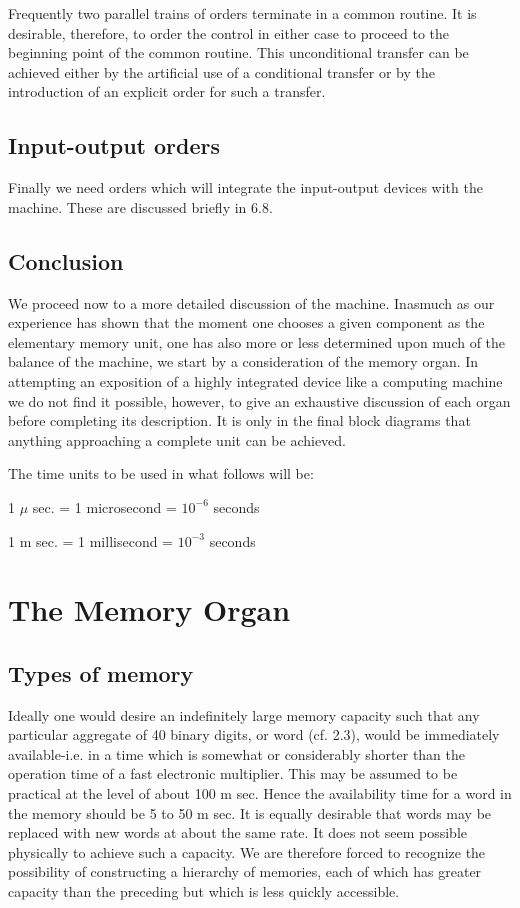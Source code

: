 \documentclass[12pt]{amsart}
\begin{document}
Frequently two parallel trains of orders terminate in a common routine. It is desirable, therefore, to order the control in either case to proceed to the beginning point of the common routine. This unconditional transfer can be achieved either by the artificial use of a conditional transfer or by the introduction of an explicit order for such a transfer.

\subsection{Input-output orders}
Finally we need orders which will integrate the input-output devices with the machine. These are discussed briefly in 6.8.

\subsection{Conclusion}
We proceed now to a more detailed discussion of the machine. Inasmuch as our experience has shown that the moment one chooses a given component as the elementary memory unit, one has also more or less determined upon much of the balance of the machine, we start by a consideration of the memory organ. In attempting an exposition of a highly integrated device like a computing machine we do not find it possible, however, to give an exhaustive discussion of each organ before completing its description. It is only in the final block diagrams that anything approaching a complete unit can be achieved.

The time units to be used in what follows will be:
\begin{center}
1 $\mu$ sec. = 1 microsecond = $10^{-6}$ seconds

1 m sec. = 1 millisecond = $10^{-3}$ seconds
\end{center}

\section{The Memory Organ}

\subsection{Types of memory}
Ideally one would desire an indefinitely large memory capacity such that any particular aggregate of 40 binary digits, or word (cf. 2.3), would be immediately available-i.e. in a time which is somewhat or considerably shorter than the operation time of a fast electronic multiplier. This may be assumed to be practical at the level of about 100 m sec. Hence the availability time for a word in the memory should be 5 to 50 m sec. It is equally desirable that words may be replaced with new words at about the same rate. It does not seem possible physically to achieve such a capacity. We are therefore forced to recognize the possibility of constructing a hierarchy of memories, each of which has greater capacity than the preceding but which is less quickly accessible.
\end{document}
